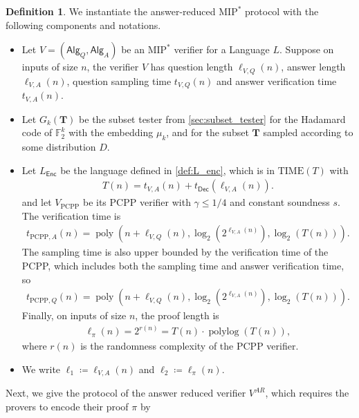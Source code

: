\documentclass[11pt]{article}
\theoremstyle{plain}
\theoremstyle{definition}
\newtheorem{definition}[theorem]{Definition}
\newcommand{\poly} {\ensuremath{\operatorname{poly}}}
\newcommand{\polylog} {\ensuremath{\operatorname{polylog}}}
\newcommand{\1}{\mathbb{1}} %
\newcommand{\bF}{\mathbb{F}}
\newcommand{\bT}{\pmb{T}}
\newcommand{\PCPP}{\mathrm{PCPP}}
\newcommand{\Enc}{\mathsf{Enc}}
\newcommand{\Dec}{\mathsf{Dec}}
\newcommand{\Alg}{\mathsf{Alg}}
\newcommand{\MIP}{\mathrm{MIP}}
\begin{document}
\begin{definition}
    \label{def:params}
    We instantiate the answer-reduced $\MIP^\ast$ protocol with the following components and notations.
    \begin{itemize}
        \item Let $V = (\Alg_Q, \Alg_A)$ be an $\MIP^\ast$ verifier for a Language $L$.
        Suppose on inputs of size $n$, the verifier $V$ has question length $\ell_{V,Q}(n)$,
        answer length $\ell_{V,A}(n)$, question sampling time $t_{V,Q}(n)$ and answer verification time $t_{V,A}(n)$.
        \item Let $G_k(\bT)$ be the subset tester from \cref{sec:subset_tester} for the Hadamard code of $\bF_2^k$ with the embedding $\mu_k$, and for
        the subset $\bT$ sampled according to some distribution $D$.
        \item Let $L_{\Enc}$ be the language defined in \cref{def:L_enc}, which is in $\text{TIME}(T)$ with
        \begin{align*}
            T(n) = t_{V,A}(n) + t_{\Dec}(\ell_{V,A}(n)).
        \end{align*}
        and let $V_{\PCPP}$ be its $\PCPP$ verifier with 
        $\gamma \leq 1/4$ and constant soundness $s$. 
        The verification time is 
        \begin{align*}
            t_{\PCPP,A}(n) = \poly(n+\ell_{V,Q}(n), \log_2(2^{\ell_{V,A}(n)}), \log_2(T(n))).
        \end{align*}
        The sampling time is also upper bounded by the verification time of the PCPP, which includes both the sampling time and answer verification time, so
        \begin{align*}
            t_{\PCPP,Q}(n) = \poly(n+\ell_{V,Q}(n), \log_2(2^{\ell_{V,A}(n)}), \log_2(T(n))).
        \end{align*}
        Finally, on inputs of size $n$, the proof length is
        \begin{align*}
            \ell_\pi(n) = 2^{r(n)} = T(n)\cdot \polylog(T(n)),
        \end{align*}
        where $r(n)$ is the randomness complexity of the PCPP verifier.
        \item We write $\ell_1 \coloneqq \ell_{V,A}(n)$ and $\ell_2 \coloneqq \ell_{\pi}(n)$.
    \end{itemize}
\end{definition}
Next, we give the protocol of the answer reduced verifier $V^{AR}$, which requires the provers to encode their proof $\pi$ by
\end{document}
